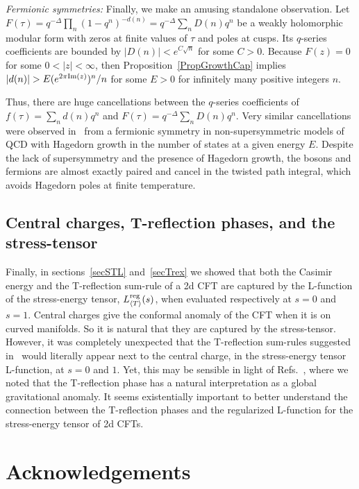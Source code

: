 \documentclass[11pt,a4paper]{article}
\newcommand{\reg}{{\rm reg}}
\begin{document}
{\em Fermionic symmetries:}
Finally, we make an amusing standalone observation. Let $F(\tau)= q^{-\Delta} \prod_n (1-q^n)^{-d(n)} =q^{-\Delta} \sum_n D(n) q^n$ be a weakly holomorphic modular form with zeros at finite values of $\tau$ and poles at cusps. Its $q$-series coefficients are bounded by $|D(n)| < e^{C \sqrt{n}}$ for some $C>0$. Because $F(z) = 0$ for some $0< |z| < \infty$, then Proposition~\ref{PropGrowthCap} implies $|d(n)| > E (e^{2 \pi {\rm Im}(z)})^n/n$ for some $E>0$ for infinitely many positive integers $n$. 

Thus, there are huge cancellations between the $q$-series coefficients of $f(\tau) = \sum_n d(n) q^n$ and $F(\tau) = q^{-\Delta} \sum_n D(n) q^n$. Very similar cancellations were observed in~\cite{36-Fermionic1, 37-Fermionic2, 38-Fermionic3, 39-Fermionic4} from a fermionic symmetry in non-supersymmetric models of QCD with Hagedorn growth in the number of states at a given energy $E$. Despite the lack of supersymmetry and the presence of Hagedorn growth, the bosons and fermions are almost exactly paired and cancel in the twisted path integral, which avoids Hagedorn poles at finite temperature. 


\subsection{Central charges, T-reflection phases, and the stress-tensor}

Finally, in sections~\ref{secSTL} and~\ref{secTrex} we showed that both the Casimir energy and the T-reflection sum-rule of a 2d CFT are captured by the L-function of the stress-energy tensor, $L_{\langle T \rangle}^{\reg}(s)$, when evaluated respectively at $s = 0$ and $s = 1$. Central charges give the conformal anomaly of the CFT when it is on curved manifolds. So it is natural that they are captured by the stress-tensor. However, it was completely unexpected that the T-reflection sum-rules suggested in~\cite{14T-rex0, 06T-rex1} would literally appear next to the central charge, in the stress-energy tensor L-function, at $s = 0$ and $1$. Yet, this may be sensible in light of Refs.~\cite{06T-rex1, 07T-rex2}, where we noted that the T-reflection phase has a natural interpretation as a global gravitational anomaly. It seems existentially important to better understand the connection between the T-reflection phases and the regularized L-function for the stress-energy tensor of 2d CFTs.

\section*{Acknowledgements}
\end{document}

